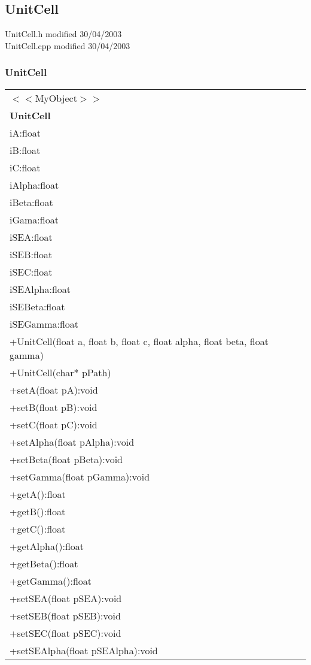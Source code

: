 \subsection{UnitCell}
{\footnotesize UnitCell.h modified  30/04/2003\\ UnitCell.cpp modified 30/04/2003}

\subsubsection{UnitCell}
\begin{table}[h]
\begin{tabular}{|l|}\hline
$<<$MyObject$>>$\\
\textbf{UnitCell}\\
\hline
iA:float\\
iB:float\\
iC:float\\
iAlpha:float\\
iBeta:float\\
iGama:float\\
iSEA:float\\
iSEB:float\\
iSEC:float\\
iSEAlpha:float\\
iSEBeta:float\\
iSEGamma:float\\
\hline
+UnitCell(float a, float b, float c, float alpha, float beta, float gamma)\\
+UnitCell(char* pPath)\\
+setA(float pA):void\\
+setB(float pB):void\\
+setC(float pC):void\\
+setAlpha(float pAlpha):void\\
+setBeta(float pBeta):void\\
+setGamma(float pGamma):void\\
+getA():float\\
+getB():float\\
+getC():float\\
+getAlpha():float\\
+getBeta():float\\
+getGamma():float\\
+setSEA(float pSEA):void\\
+setSEB(float pSEB):void\\
+setSEC(float pSEC):void\\
+setSEAlpha(float pSEAlpha):void\\

\end{tabular}
\end{table}
